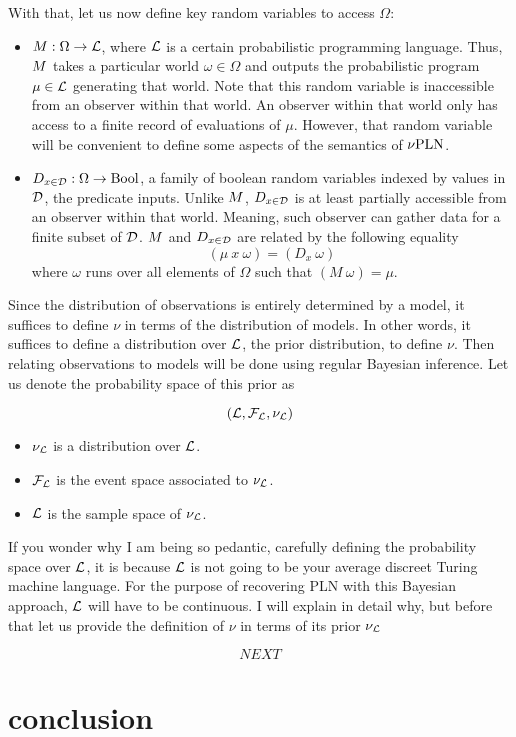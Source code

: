\documentclass[]{article}
\begin{document}
With that, let us now define key random variables to access $\Omega$:
\begin{itemize}
\item $M : \Omega \to \mathcal{L}$, where $\mathcal{L}$ is a certain
  probabilistic programming language.  Thus, $M$ takes a particular
  world $\omega \in \Omega$ and outputs the probabilistic program $\mu
  \in \mathcal{L}$ generating that world.  Note that this random
  variable is inaccessible from an observer within that world.  An
  observer within that world only has access to a finite record of
  evaluations of $\mu$.  However, that random variable will be
  convenient to define some aspects of the semantics of $\nu\textup{PLN}$.
\item $D_{x\in\mathcal{D}} : \Omega \to \textup{Bool}$, a family of boolean random variables
  indexed by values in $\mathcal{D}$, the predicate inputs.  Unlike
  $M$, $D_{x\in\mathcal{D}}$ is at least partially accessible from an observer
  within that world.  Meaning, such observer can gather data for a
  finite subset of $\mathcal{D}$.  $M$ and $D_{x\in\mathcal{D}}$ are related by the
  following equality
  $$(\mu\ x\ \omega) = (D_x\ \omega)$$ where $\omega$ runs over all
  elements of $\Omega$ such that $(M\ \omega) = \mu$.
\end{itemize}
Since the distribution of observations is entirely determined by a
model, it suffices to define $\nu$ in terms of the distribution of
models.  In other words, it suffices to define a distribution over
$\mathcal{L}$, the prior distribution, to define $\nu$.  Then relating
observations to models will be done using regular Bayesian inference.
Let us denote the probability space of this prior as

$$(\mathcal{L}, \mathcal{F}_{\mathcal{L}}, \nu_{\mathcal{L}})$$

\begin{itemize}
\item $\nu_{\mathcal{L}}$ is a distribution over $\mathcal{L}$.
\item $\mathcal{F}_{\mathcal{L}}$ is the event space associated to
  $\nu_{\mathcal{L}}$.
\item $\mathcal{L}$ is the sample space of $\nu_{\mathcal{L}}$.
\end{itemize}
If you wonder why I am being so pedantic, carefully defining the
probability space over $\mathcal{L}$, it is because $\mathcal{L}$ is not
going to be your average discreet Turing machine language.  For the
purpose of recovering PLN with this Bayesian approach, $\mathcal{L}$
will have to be continuous.  I will explain in detail why, but before
that let us provide the definition of $\nu$ in terms of its prior
$\nu_{\mathcal{L}}$

$$NEXT$$

\section{conclusion}



\end{document}

